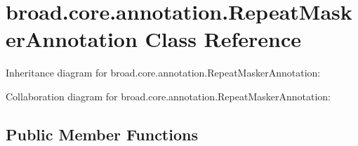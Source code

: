 \hypertarget{classbroad_1_1core_1_1annotation_1_1_repeat_masker_annotation}{\section{broad.\+core.\+annotation.\+Repeat\+Masker\+Annotation Class Reference}
\label{classbroad_1_1core_1_1annotation_1_1_repeat_masker_annotation}
}


Inheritance diagram for broad.\+core.\+annotation.\+Repeat\+Masker\+Annotation\+:


Collaboration diagram for broad.\+core.\+annotation.\+Repeat\+Masker\+Annotation\+:
\subsection*{Public Member Functions}
